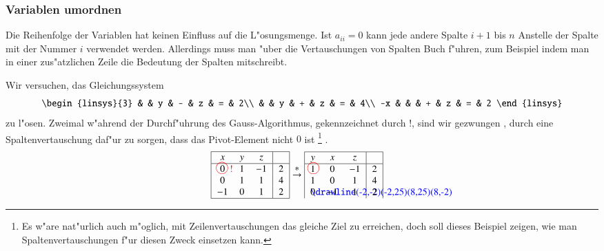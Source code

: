 \subsubsection{Variablen umordnen}
Die Reihenfolge der Variablen hat keinen Einfluss auf die L"osungsmenge.
Ist $a_{ii}=0$ kann jede andere Spalte $i+1$ bis $n$ Anstelle der
Spalte mit der Nummer $i$ verwendet werden.
Allerdings muss man "uber
die Vertauschungen von Spalten Buch f"uhren, zum Beispiel indem man in
einer zus"atzlichen Zeile die Bedeutung der Spalten mitschreibt.

\begin{beispiel}[\bf Beispiel]
Wir versuchen, das Gleichungssystem
\[
\begin{linsys}{3}
   &   & y & - & z & = & 2\\
   &   & y & + & z & = & 4\\
-x &   &   & + & z & = & 2
\end{linsys}
\]
zu l"osen.
Zweimal w"ahrend der Durchf"uhrung des Gauss-Algorithmus,
gekennzeichnet durch {\color{red}!},
sind wir gezwungen%
, durch eine Spaltenvertauschung daf"ur zu
sorgen, dass das Pivot-Element nicht $0$ ist%
\footnote{Es w"are nat"urlich auch m"oglich,
mit Zeilenvertauschungen das gleiche Ziel zu erreichen, doch soll
dieses Beispiel zeigen, wie man Spaltenvertauschungen f"ur diesen
Zweck einsetzen kann.}%
.
\begin{align*}
\begin{tabular}{|>{$}c<{$}>{$}c<{$}>{$}c<{$}|>{$}c<{$}|}
\hline
x&y&z&\\
\hline
0%
\begin{picture}(0,0)
\color{red}\put(-3,4){\circle{12}}
\put(5,0){!}
\end{picture}%
&1&-1&2\\
0&1&1&4\\
-1&0&1&2\\
\hline
\end{tabular}
&\overset{\displaystyle *}{\rightarrow}
\begin{tabular}{|>{$}c<{$}>{$}c<{$}>{$}c<{$}|>{$}c<{$}|}
\hline
y&x&z&\\
\hline
\begin{picture}(0,0)
\color{red}\put(3,4){\circle{12}}
\end{picture}%
1&0&-1&2\\
1&0&1&4\\
\begin{picture}(0,0)
\color{blue}\drawline(-2,-2)(-2,25)(8,25)(8,-2)
\end{picture}%
0&-1&1&2\\

\end{tabular}
\end{align*}
\end{beispiel}
